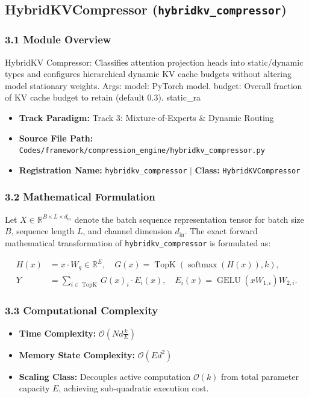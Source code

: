 \subsection{HybridKVCompressor (\texttt{hybridkv\_compressor})}
\label{sec:app_module_hybridkv\_compressor}

\subsubsection*{3.1 Module Overview}
HybridKV Compressor: Classifies attention projection heads into static/dynamic types and configures hierarchical dynamic KV cache budgets without altering model stationary weights.  Args:     model: PyTorch model.     budget: Overall fraction of KV cache budget to retain (default 0.3).     static\_ra
\begin{itemize}
    \item \textbf{Track Paradigm:} Track 3: Mixture-of-Experts & Dynamic Routing
    \item \textbf{Source File Path:} \texttt{Codes/framework/compression\_engine/hybridkv\_compressor.py}
    \item \textbf{Registration Name:} \texttt{hybridkv\_compressor} $\mid$ \textbf{Class:} \texttt{HybridKVCompressor}
\end{itemize}

\subsubsection*{3.2 Mathematical Formulation}
Let $X \in \mathbb{R}^{B \times L \times d_{\text{in}}}$ denote the batch sequence representation tensor for batch size $B$, sequence length $L$, and channel dimension $d_{\text{in}}$. The exact forward mathematical transformation of \texttt{hybridkv\_compressor} is formulated as:

\begin{align}
H(x) &= x \cdot W_g \in \mathbb{R}^{E}, \quad G(x) = \operatorname{TopK}\left(\operatorname{softmax}(H(x)), k\right), \\
Y &= \sum_{i \in \operatorname{TopK}} G(x)_i \cdot E_i(x), \quad E_i(x) = \operatorname{GELU}(x W_{1, i}) W_{2, i}.
\end{align}


\subsubsection*{3.3 Computational Complexity}
\begin{itemize}
    \item \textbf{Time Complexity:} $\mathcal{O}(N d \frac{k}{E})$
    \item \textbf{Memory State Complexity:} $\mathcal{O}(E d^2)$
    \item \textbf{Scaling Class:} Decouples active computation $\mathcal{O}(k)$ from total parameter capacity $E$, achieving sub-quadratic execution cost.
\end{itemize}

